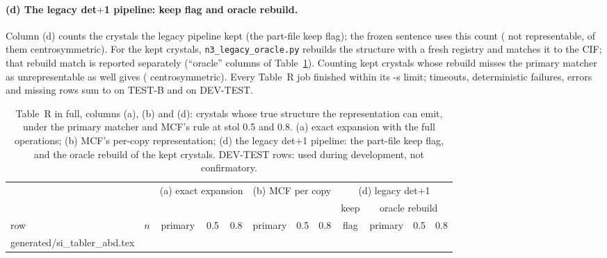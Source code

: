 \documentclass[journal=acsodf,manuscript=article]{achemso}
\makeatletter
\newcommand{\inputrows}[1]{\@@input #1 }
\makeatother
\begin{document}
\paragraph{(d) The legacy det$+$1 pipeline: keep flag and oracle rebuild.} Column (d) counts
the crystals the legacy pipeline kept (the part-file keep flag); the frozen sentence uses this
count (\svTRN{} not representable, \svTRM{} of them centrosymmetric). For the kept crystals,
\texttt{n3\_legacy\_oracle.py} rebuilds the structure with a fresh registry and matches it to
the CIF; that rebuild match is reported separately (``oracle'' columns of
Table~\ref{tab:si_tabler_abd}). Counting kept crystals whose rebuild misses the primary
matcher as unrepresentable as well gives \svTRNOracle{} (\svTRMOracle{} centrosymmetric). Every
Table~R job finished within its \svTRTimeout-s limit; timeouts, deterministic failures, errors
and missing rows sum to \svTRBad{} on TEST-B and \svTRBadDev{} on DEV-TEST.

\begin{table}[htbp]
\caption{Table~R in full, columns (a), (b) and (d): crystals whose true structure the
representation can emit, under the primary matcher and MCF's rule at stol 0.5 and 0.8. (a) exact
expansion with the full operations; (b) MCF's per-copy representation; (d) the legacy det$+$1
pipeline: the part-file keep flag, and the oracle rebuild of the kept crystals. DEV-TEST rows:
used during development, not confirmatory.}
\label{tab:si_tabler_abd}
\centering
\footnotesize
\setlength{\tabcolsep}{3pt}
\begin{tabular}{@{}lrcccccccccc@{}}
\toprule
 & & \multicolumn{3}{c}{(a) exact expansion} & \multicolumn{3}{c}{(b) MCF per copy} & \multicolumn{4}{c}{(d) legacy det$+$1} \\
\cmidrule(lr){3-5}\cmidrule(lr){6-8}\cmidrule(lr){9-12}
 & & & & & & & & keep & \multicolumn{3}{c}{oracle rebuild} \\
\cmidrule(lr){10-12}
row & $n$ & primary & 0.5 & 0.8 & primary & 0.5 & 0.8 & flag & primary & 0.5 & 0.8 \\
\midrule
\inputrows{generated/si_tabler_abd.tex}
\bottomrule
\end{tabular}
\end{table}
\end{document}
